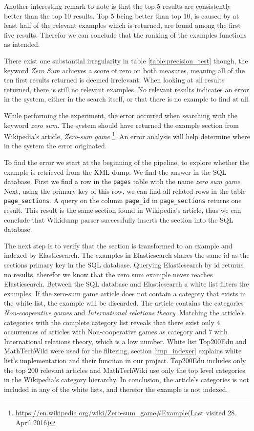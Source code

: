 Another interesting remark to note is that the top 5 results are consistently better than the top 10 results. Top 5 being better than top 10, is caused by at least half of the relevant examples which is returned, are found among the first five results. Therefor we can conclude that the ranking of the examples functions as intended. 

There exist one substantial irregularity in table \ref{table:precision_test} though, the keyword \textit{Zero Sum} achieves a score of zero on both measures, meaning all of the ten first results returned is deemed irrelevant. When looking at all results returned, there is still no relevant examples. No relevant results indicates an error in the system, either in the search itself, or that there is no example to find at all.

While performing the experiment, the error occurred when searching with the keyword \textit{zero sum}. The system should have returned the example section from Wikipedia's article, \textit{Zero-sum game} \footnote{\url{https://en.wikipedia.org/wiki/Zero-sum\_game\#Example}(Last visited 28. April 2016)}. An error analysis will help determine where in the system the error originated. 

To find the error we start at the beginning of the pipeline, to explore whether the example is retrieved from the XML dump. We find the answer in the SQL database. First we find a row in the \texttt{pages} table with the name \textit{zero sum game}. Next, using the primary key of this row, we can find all related rows in the table \texttt{page\_sections}. A query on the column \texttt{page\_id} in \texttt{page\_sections} returns one result. This result is the same section found in Wikipedia's article, thus we can conclude that Wikidump parser successfully inserts the section into the SQL database.

The next step is to verify that the section is transformed to an example and indexed by Elasticsearch. The examples in Elasticsearch shares the same id as the sections primary key in the SQL database. Querying Elasticsearch by id returns no results, therefor we know that the zero sum example never reaches Elasticsearch. Between the SQL database and Elasticsearch a white list filters the examples. If the zero-sum game article does not contain a category that exists in the white list, the example will be discarded. The article contains the categories \textit{Non-cooperative games} and \textit{International relations theory}. Matching the article's categories with the complete category list reveals that there exist only 4 occurrences of articles with Non-cooperative games as category and 7 with International relations theory, which is a low number. White list Top200Edu and MathTechWiki were used for the filtering, section \ref{imp_indexer} explains white list's implementation and their function in our project. Top200Edu includes only the top 200 relevant articles and MathTechWiki use only the top level categories in the Wikipedia's category hierarchy. In conclusion, the article's categories is not included in any of the white lists, and therefor the example is not indexed.

